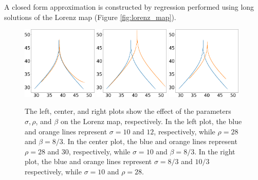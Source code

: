 \documentclass[preprint,12pt]{elsarticle}
\begin{document}
A closed form approximation is constructed by regression performed using long solutions 
of the Lorenz map (Figure \ref{fig:lorenz_map}). 
\begin{figure}
    \centering
    \includegraphics[width=0.32\textwidth]{lorenz_zmax_sigma.png}
    \hspace{0.005\textwidth}
    \includegraphics[width=0.32\textwidth]{lorenz_zmax_rho.png}
    \hspace{0.005\textwidth}
    \includegraphics[width=0.32\textwidth]{lorenz_zmax_beta.png}
    \caption{
The left, center, and right plots show the effect of the
    parameters $\sigma, \rho$, and $\beta$ on the Lorenz map, respectively.
    In the left plot, the blue and orange lines represent
    $\sigma=10$ and $12$, respectively, while $\rho  = 28$ and $\beta = 8/3.$
    In the center plot, the blue and orange lines represent
    $\rho=28$ and $30$, respectively, while $\sigma = 10$ and $\beta  = 8/3.$ 
    In the right plot, the blue and orange lines represent
    $\sigma=8/3$ and $10/3$ respectively, while $\sigma = 10$ and 
		$\rho = 28.$}
    \label{fig:lorenz_params}
\end{figure}

\end{document}
